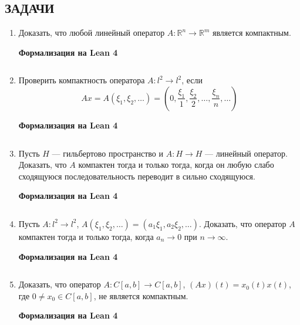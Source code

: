 \documentclass[12pt,a4paper]{article}
\begin{document}
\subsection*{ЗАДАЧИ}
\begin{enumerate}
\newpage
\item Доказать, что любой линейный оператор $A: \mathbb{R}^{n} \rightarrow \mathbb{R}^{m}$ является компактным.


\begin{center}\small\textbf{Формализация на Lean 4}\end{center}
\inputminted{lean}{FunAn/Section21_CompactOperators/Task01.lean}

\newpage
\item Проверить компактность оператора $A: l^{2} \rightarrow l^{2}$, если
$$ Ax = A(\xi_{1}, \xi_{2}, \dots) = (0, \frac{\xi_{1}}{1}, \frac{\xi_{2}}{2}, \dots, \frac{\xi_{n}}{n}, \dots) $$


\begin{center}\small\textbf{Формализация на Lean 4}\end{center}
\inputminted{lean}{FunAn/Section21_CompactOperators/Task02.lean}

\newpage
\item Пусть $H$ — гильбертово пространство и $A: H \rightarrow H$ — линейный оператор. Доказать, что $A$ компактен тогда и только тогда, когда он любую слабо сходящуюся последовательность переводит в сильно сходящуюся.


\begin{center}\small\textbf{Формализация на Lean 4}\end{center}
\inputminted{lean}{FunAn/Section21_CompactOperators/Task03.lean}

\newpage
\item Пусть $A: l^{2} \rightarrow l^{2}$, $A(\xi_{1}, \xi_{2}, \dots) = (a_{1}\xi_{1}, a_{2}\xi_{2}, \dots)$. Доказать, что оператор $A$ компактен тогда и только тогда, когда $a_{n} \rightarrow 0$ при $n \rightarrow \infty$.


\begin{center}\small\textbf{Формализация на Lean 4}\end{center}
\inputminted{lean}{FunAn/Section21_CompactOperators/Task04.lean}

\newpage
\item Доказать, что оператор $A: C[a,b] \rightarrow C[a,b]$, $(Ax)(t) = x_{0}(t)x(t)$, где $0 \ne x_{0} \in C[a,b]$, не является компактным.

\begin{center}\small\textbf{Формализация на Lean 4}\end{center}
\inputminted{lean}{FunAn/Section21_CompactOperators/Task05.lean}


\end{enumerate}
\end{document}
